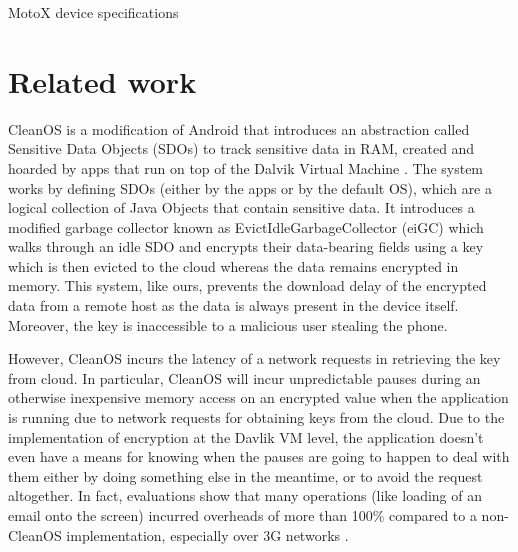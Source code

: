 \documentclass[conference,10pt]{IEEEtran}
\begin{document}
\begin{table}[]
\centering
\caption{MotoX device specifications}
\label{table:specs}
\end{table}




\section{Related work}
CleanOS is a modification of Android that introduces an abstraction called Sensitive Data Objects (SDOs) to 
track sensitive data in RAM, created and hoarded by apps that run on top of the Dalvik Virtual Machine 
\cite{cleanos}. The system works by defining SDOs (either by the apps or by the default OS), which are a 
logical collection of Java Objects that contain sensitive data. It introduces a modified garbage collector 
known as EvictIdleGarbageCollector (eiGC) which walks through an idle SDO and encrypts their data-bearing 
fields using a key which is then evicted to the cloud whereas the data remains encrypted in memory.  This 
system, like ours, prevents the download delay of the encrypted data from a remote host as the data is 
always present in the device itself. Moreover, the key is inaccessible to a malicious user stealing the 
phone.

However, CleanOS incurs the latency of a network requests in retrieving the key from cloud.  In particular, 
CleanOS will incur unpredictable pauses during an otherwise inexpensive memory access on an encrypted value 
when the application is running due to network requests for obtaining keys from the cloud. Due to the 
implementation of encryption at the Davlik VM level, the application doesn't even have a means for knowing 
when the pauses are going to happen to deal with them either by doing something else in the meantime, or to 
avoid the request altogether.  In fact, evaluations show that many operations (like loading of an email 
onto the screen) incurred overheads of more than 100\% compared to a non-CleanOS implementation, especially 
over 3G networks \cite{cleanos}.
\end{document}
